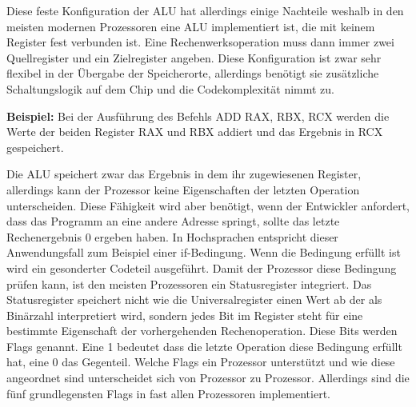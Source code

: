 \documentclass[12pt]{article}
\begin{document}
\noindent Diese feste Konfiguration der ALU hat allerdings einige Nachteile weshalb in den meisten modernen Prozessoren eine ALU implementiert ist, die mit keinem Register fest verbunden ist. Eine Rechenwerksoperation muss dann immer zwei Quellregister und ein Zielregister angeben. Diese Konfiguration ist zwar sehr flexibel in der Übergabe der Speicherorte, allerdings benötigt sie zusätzliche Schaltungslogik auf dem Chip und die Codekomplexität nimmt zu.

\par\bigskip
\noindent \textbf{Beispiel:} Bei der Ausführung des Befehls ADD RAX, RBX, RCX werden die Werte der beiden Register RAX und RBX addiert und das Ergebnis in RCX gespeichert.

\par\smallskip\noindent Die ALU speichert zwar das Ergebnis in dem ihr zugewiesenen Register, allerdings kann der Prozessor keine Eigenschaften der letzten Operation unterscheiden. Diese Fähigkeit wird aber benötigt, wenn der Entwickler anfordert, dass das Programm an eine andere Adresse springt, sollte das letzte Rechenergebnis 0 ergeben haben. In Hochsprachen entspricht dieser Anwendungsfall zum Beispiel einer if-Bedingung. Wenn die Bedingung erfüllt ist wird ein gesonderter Codeteil ausgeführt. Damit der Prozessor diese Bedingung prüfen kann, ist den meisten Prozessoren ein Statusregister integriert. Das Statusregister speichert nicht wie die Universalregister einen Wert ab der als Binärzahl interpretiert wird, sondern jedes Bit im Register steht für eine bestimmte Eigenschaft der vorhergehenden Rechenoperation. Diese Bits werden Flags genannt. Eine 1 bedeutet dass die letzte Operation diese Bedingung erfüllt hat, eine 0 das Gegenteil. Welche Flags ein Prozessor unterstützt und wie diese angeordnet sind unterscheidet sich von Prozessor zu Prozessor. Allerdings sind die fünf grundlegensten Flags in fast allen Prozessoren implementiert.
\end{document}
